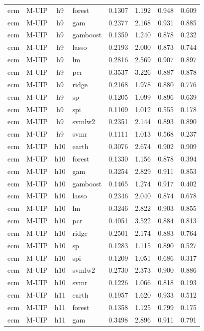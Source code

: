 \begin{ThreePartTable}
\begin{longtable}[t]{llclcccc}
ecm & M-UIP & h9 & forest & 0.1307 & 1.192 & 0.948 & 0.609\\
ecm & M-UIP & h9 & gam & 0.2377 & 2.168 & 0.931 & 0.885\\
ecm & M-UIP & h9 & gamboost & 0.1359 & 1.240 & 0.878 & 0.232\\
ecm & M-UIP & h9 & lasso & 0.2193 & 2.000 & 0.873 & 0.744\\
ecm & M-UIP & h9 & lm & 0.2816 & 2.569 & 0.907 & 0.897\\
ecm & M-UIP & h9 & pcr & 0.3537 & 3.226 & 0.887 & 0.878\\
ecm & M-UIP & h9 & ridge & 0.2168 & 1.978 & 0.880 & 0.776\\
ecm & M-UIP & h9 & sp & 0.1205 & 1.099 & 0.896 & 0.639\\
ecm & M-UIP & h9 & spi & 0.1109 & 1.012 & 0.555 & 0.178\\
ecm & M-UIP & h9 & svmlw2 & 0.2351 & 2.144 & 0.893 & 0.890\\
ecm & M-UIP & h9 & svmr & 0.1111 & 1.013 & 0.568 & 0.237\\
\addlinespace
ecm & M-UIP & h10 & earth & 0.3076 & 2.674 & 0.902 & 0.909\\
ecm & M-UIP & h10 & forest & 0.1330 & 1.156 & 0.878 & 0.394\\
ecm & M-UIP & h10 & gam & 0.3254 & 2.829 & 0.911 & 0.853\\
ecm & M-UIP & h10 & gamboost & 0.1465 & 1.274 & 0.917 & 0.402\\
ecm & M-UIP & h10 & lasso & 0.2346 & 2.040 & 0.874 & 0.678\\
ecm & M-UIP & h10 & lm & 0.3246 & 2.822 & 0.903 & 0.855\\
ecm & M-UIP & h10 & pcr & 0.4051 & 3.522 & 0.884 & 0.813\\
ecm & M-UIP & h10 & ridge & 0.2501 & 2.174 & 0.883 & 0.764\\
ecm & M-UIP & h10 & sp & 0.1283 & 1.115 & 0.890 & 0.527\\
ecm & M-UIP & h10 & spi & 0.1209 & 1.051 & 0.686 & 0.317\\
ecm & M-UIP & h10 & svmlw2 & 0.2730 & 2.373 & 0.900 & 0.886\\
ecm & M-UIP & h10 & svmr & 0.1226 & 1.066 & 0.818 & 0.193\\
\addlinespace
ecm & M-UIP & h11 & earth & 0.1957 & 1.620 & 0.933 & 0.512\\
ecm & M-UIP & h11 & forest & 0.1358 & 1.125 & 0.799 & 0.175\\
ecm & M-UIP & h11 & gam & 0.3498 & 2.896 & 0.911 & 0.791\\

\end{longtable}
\end{ThreePartTable}
